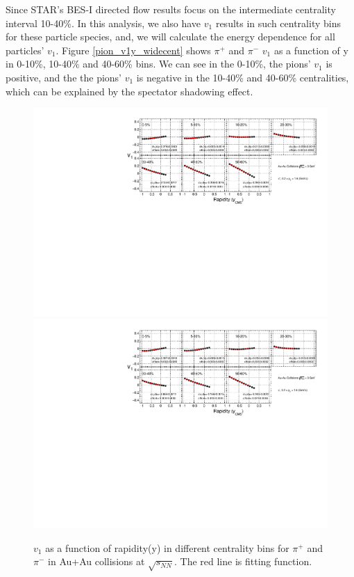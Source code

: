 Since STAR's BES-I directed flow results focus on the intermediate centrality interval 10-40\%. In this analysis, we also have $v_{1}$ results in such centrality bins for these particle species, and, we will calculate the energy dependence for all particles' $v_{1}$. Figure \ref{pion_v1y_widecent} shows $\pi^{+}$ and $\pi^{-}$ $v_{1}$ as a function of y in 0-10\%, 10-40\% and 40-60\% bins. We can see in the 0-10\%, the pions' $v_{1}$ is positive, and the the pions' $v_{1}$ is negative in the 10-40\% and 40-60\% centralities, which can be explained by the spectator shadowing effect.

\begin{figure}[h]
\includegraphics[scale=0.6]{chapter3/fig/v1ypikp/v1pionp_cent.pdf}
\includegraphics[scale=0.6]{chapter3/fig/v1ypikp/v1pionm_cent.pdf}
\caption{\label{pion_v1y_cent} $v_{1}$ as a function of rapidity(y) in different centrality bins for $\pi^{+}$ and $\pi^{-}$ in Au+Au collisions at $\sqrt{s_{NN}}$. The red line is fitting function.}
\end{figure}

